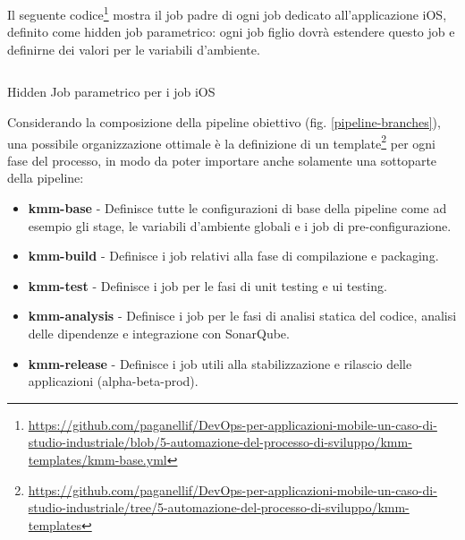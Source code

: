 Il seguente codice\footnote{\href{https://github.com/paganellif/DevOps-per-applicazioni-mobile-un-caso-di-studio-industriale/blob/5-automazione-del-processo-di-sviluppo/kmm-templates/kmm-base.yml}{https://github.com/paganellif/DevOps-per-applicazioni-mobile-un-caso-di-studio-industriale/blob/5-automazione-del-processo-di-sviluppo/kmm-templates/kmm-base.yml}} mostra il job padre di ogni job dedicato all'applicazione iOS, 
definito come hidden job parametrico: 
ogni job figlio dovrà estendere questo job e definirne dei valori per le variabili d'ambiente.

\begin{listing}[H]
    \inputminted{yaml}{code/base-ios-job.yaml}
    \caption{Hidden Job parametrico per i job iOS}
\end{listing}

Considerando la composizione della pipeline obiettivo (fig. \ref{pipeline-branches}),
una possibile organizzazione ottimale è la definizione di un template\footnote{\href{https://github.com/paganellif/DevOps-per-applicazioni-mobile-un-caso-di-studio-industriale/tree/5-automazione-del-processo-di-sviluppo/kmm-templates}{https://github.com/paganellif/DevOps-per-applicazioni-mobile-un-caso-di-studio-industriale/tree/5-automazione-del-processo-di-sviluppo/kmm-templates}} per ogni fase del processo,
in modo da poter importare anche solamente una sottoparte della pipeline:

\begin{itemize}
    \item \textbf{kmm-base} - Definisce tutte le configurazioni di base della pipeline come ad esempio gli stage, le variabili d'ambiente globali e i job di pre-configurazione.
    
    \item \textbf{kmm-build} - Definisce i job relativi alla fase di compilazione e packaging.
    
    \item \textbf{kmm-test} - Definisce i job per le fasi di unit testing e ui testing.
    
    \item \textbf{kmm-analysis} - Definisce i job per le fasi di analisi statica del codice, analisi delle dipendenze e integrazione con SonarQube.
    
    \item \textbf{kmm-release} - Definisce i job utili alla stabilizzazione e rilascio delle applicazioni (alpha-beta-prod).
\end{itemize}

